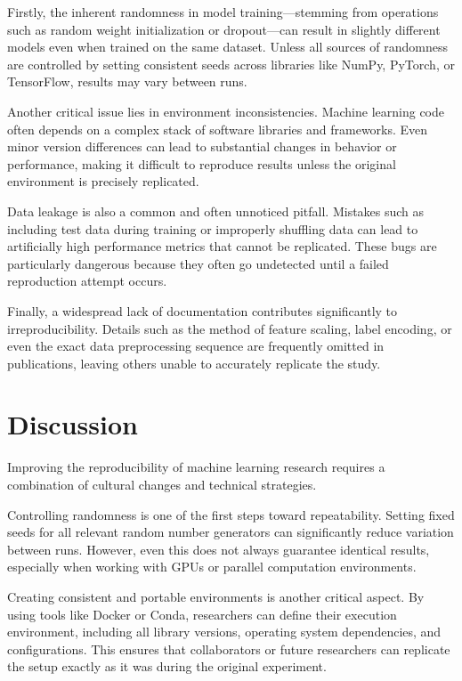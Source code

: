 \documentclass[11pt]{article}
\begin{document}
Firstly, the inherent randomness in model training—stemming from operations such as random weight initialization or dropout—can result in slightly different models even when trained on the same dataset. Unless all sources of randomness are controlled by setting consistent seeds across libraries like NumPy, PyTorch, or TensorFlow, results may vary between runs.

Another critical issue lies in environment inconsistencies. Machine learning code often depends on a complex stack of software libraries and frameworks. Even minor version differences can lead to substantial changes in behavior or performance, making it difficult to reproduce results unless the original environment is precisely replicated.

Data leakage is also a common and often unnoticed pitfall. Mistakes such as including test data during training or improperly shuffling data can lead to artificially high performance metrics that cannot be replicated. These bugs are particularly dangerous because they often go undetected until a failed reproduction attempt occurs.

Finally, a widespread lack of documentation contributes significantly to irreproducibility. Details such as the method of feature scaling, label encoding, or even the exact data preprocessing sequence are frequently omitted in publications, leaving others unable to accurately replicate the study.


\section{Discussion}
\label{sec:system}
Improving the reproducibility of machine learning research requires a combination of cultural changes and technical strategies.

Controlling randomness is one of the first steps toward repeatability. Setting fixed seeds for all relevant random number generators can significantly reduce variation between runs. However, even this does not always guarantee identical results, especially when working with GPUs or parallel computation environments.

Creating consistent and portable environments is another critical aspect. By using tools like Docker or Conda, researchers can define their execution environment, including all library versions, operating system dependencies, and configurations. This ensures that collaborators or future researchers can replicate the setup exactly as it was during the original experiment.
\end{document}
